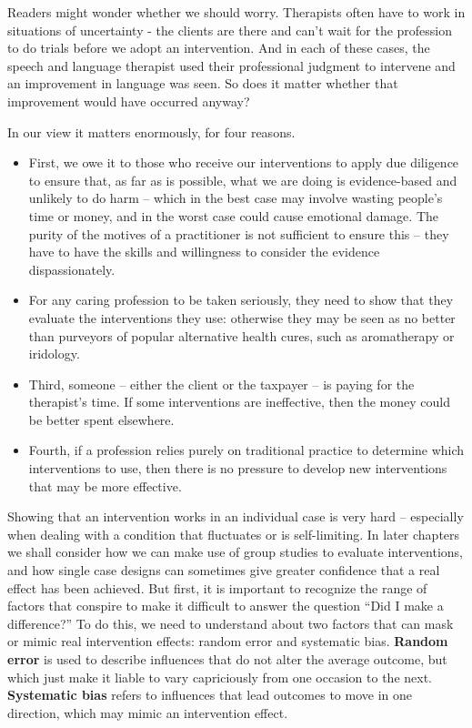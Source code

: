 \documentclass{krantz}
\providecommand{\tightlist}{%
\setlength{\itemsep}{0pt}\setlength{\parskip}{0pt}}
\begin{document}
Readers might wonder whether we should worry. Therapists often have to work in situations of uncertainty - the clients are there and can't wait for the profession to do trials before we adopt an intervention. And in each of these cases, the speech and language therapist used their professional judgment to intervene and an improvement in language was seen. So does it matter whether that improvement would have occurred anyway?

In our view it matters enormously, for four reasons.

\begin{itemize}
\tightlist
\item
  First, we owe it to those who receive our interventions to apply due diligence to ensure that, as far as is possible, what we are doing is evidence-based and unlikely to do harm -- which in the best case may involve wasting people's time or money, and in the worst case could cause emotional damage. The purity of the motives of a practitioner is not sufficient to ensure this -- they have to have the skills and willingness to consider the evidence dispassionately.
\item
  For any caring profession to be taken seriously, they need to show that they evaluate the interventions they use: otherwise they may be seen as no better than purveyors of popular alternative health cures, such as aromatherapy or iridology.
\item
  Third, someone -- either the client or the taxpayer -- is paying for the therapist's time. If some interventions are ineffective, then the money could be better spent elsewhere.
\item
  Fourth, if a profession relies purely on traditional practice to determine which interventions to use, then there is no pressure to develop new interventions that may be more effective.
\end{itemize}

Showing that an intervention works in an individual case is very hard -- especially when dealing with a condition that fluctuates or is self-limiting. In later chapters we shall consider how we can make use of group studies to evaluate interventions, and how single case designs can sometimes give greater confidence that a real effect has been achieved. But first, it is important to recognize the range of factors that conspire to make it difficult to answer the question ``Did I make a difference?'' To do this, we need to understand about two factors that can mask or mimic real intervention effects: random error and systematic bias. \textbf{Random error} is used to describe influences that do not alter the average outcome, but which just make it liable to vary capriciously from one occasion to the next. \textbf{Systematic bias} refers to influences that lead outcomes to move in one direction, which may mimic an intervention effect.
\end{document}
